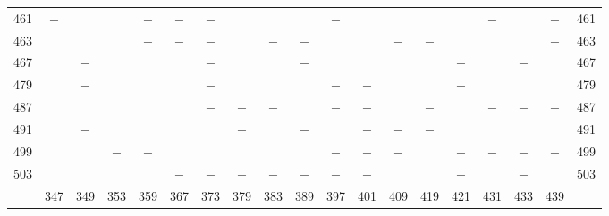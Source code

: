 \begin{center}
\begin{tabular}{r|c|c|c|c|c|c|c|c|c|c|c|c|c|c|c|c|c|r}
461 & $-$ &  &  & $-$ & $-$ & $-$ &  &  &  & $-$ &  &  &  &  & $-$ &  & $-$ & 461\\
463 &  &  &  & $-$ & $-$ & $-$ &  & $-$ & $-$ &  &  & $-$ & $-$ &  &  &  & $-$ & 463\\
467 &  & $-$ &  &  &  & $-$ &  &  & $-$ &  &  &  &  & $-$ &  & $-$ &  & 467\\
479 &  & $-$ &  &  &  & $-$ &  &  &  & $-$ & $-$ &  &  & $-$ &  &  &  & 479\\
487 &  &  &  &  &  & $-$ & $-$ & $-$ &  & $-$ & $-$ &  & $-$ &  & $-$ & $-$ & $-$ & 487\\
491 &  & $-$ &  &  &  &  & $-$ &  & $-$ &  & $-$ & $-$ & $-$ &  &  &  &  & 491\\
499 &  &  & $-$ & $-$ &  &  &  &  &  & $-$ & $-$ & $-$ &  & $-$ & $-$ & $-$ & $-$ & 499\\
503 &  &  &  &  & $-$ & $-$ & $-$ & $-$ & $-$ & $-$ & $-$ &  &  & $-$ &  & $-$ &  & 503\\
\hline
 & 347 & 349 & 353 & 359 & 367 & 373 & 379 & 383 & 389 & 397 & 401 & 409 & 419 & 421 & 431 & 433 & 439 & \\
\hline
\end{tabular}\endgroup\end{center}
\clearpage
